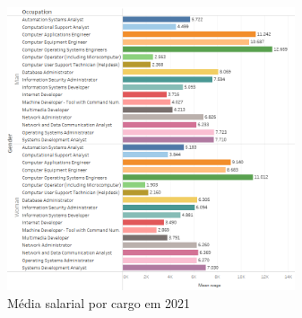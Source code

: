 \begin{figure}[htbp]
	\centerline{
		\includegraphics[width=85mm]{assets/5_sal_cbo.PNG}
	}
	\caption{Média salarial por cargo em 2021}
	\label{fig_5_sal_cbo}
\end{figure}